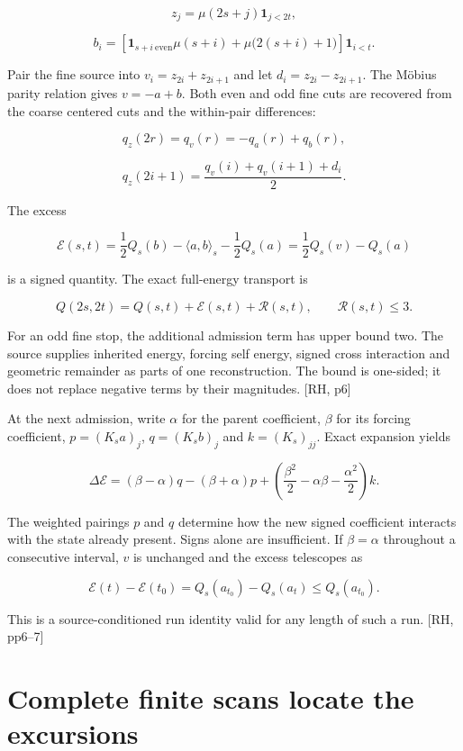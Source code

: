 \[
z_j=\mu(2s+j)\mathbf1_{j<2t},
\]

\[
b_i=\left[\mathbf1_{s+i\ \mathrm{even}}\mu(s+i)+\mu\bigl(2(s+i)+1\bigr)\right]\mathbf1_{i<t}.
\]

Pair the fine source into \(v_i=z_{2i}+z_{2i+1}\) and let \(d_i=z_{2i}-z_{2i+1}\). The Möbius parity relation gives \(v=-a+b\). Both even and odd fine cuts are recovered from the coarse centered cuts and the within-pair differences:

\[
q_z(2r)=q_v(r)=-q_a(r)+q_b(r),
\]

\[
q_z(2i+1)=\frac{q_v(i)+q_v(i+1)+d_i}{2}.
\]

The excess

\[
\mathcal E(s,t)=\frac12Q_s(b)-\langle a,b\rangle_s-\frac12Q_s(a)=\frac12Q_s(v)-Q_s(a)
\]

is a signed quantity. The exact full-energy transport is

\[
Q(2s,2t)=Q(s,t)+\mathcal E(s,t)+\mathcal R(s,t),\qquad\mathcal R(s,t)\le3.
\]

For an odd fine stop, the additional admission term has upper bound two. The source supplies inherited energy, forcing self energy, signed cross interaction and geometric remainder as parts of one reconstruction. The bound is one-sided; it does not replace negative terms by their magnitudes. {[}RH, p6{]}

At the next admission, write \(\alpha\) for the parent coefficient, \(\beta\) for its forcing coefficient, \(p=(K_sa)_j\), \(q=(K_sb)_j\) and \(k=(K_s)_{jj}\). Exact expansion yields

\[
\Delta\mathcal E=(\beta-\alpha)q-(\beta+\alpha)p+\left(\frac{\beta^2}{2}-\alpha\beta-\frac{\alpha^2}{2}\right)k.
\]

The weighted pairings \(p\) and \(q\) determine how the new signed coefficient interacts with the state already present. Signs alone are insufficient. If \(\beta=\alpha\) throughout a consecutive interval, \(v\) is unchanged and the excess telescopes as

\[
\mathcal E(t)-\mathcal E(t_0)=Q_s(a_{t_0})-Q_s(a_t)\le Q_s(a_{t_0}).
\]

This is a source-conditioned run identity valid for any length of such a run. {[}RH, pp6--7{]}

\section{Complete finite scans locate the excursions}\label{complete-finite-scans-locate-the-excursions}

